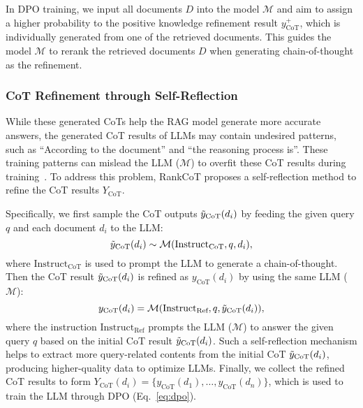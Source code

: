 In DPO training, we input all documents $D$ into the model $\mathcal{M}$ and aim to assign a higher probability to the positive knowledge refinement result $y_\text{CoT}^+$, which is individually generated from one of the retrieved documents. This guides the model $\mathcal{M}$ to rerank the retrieved documents $D$ when generating chain-of-thought as the refinement.



\subsubsection{CoT Refinement through Self-Reflection}
While these generated CoTs help the RAG model generate more accurate answers, the generated CoT results of LLMs may contain undesired patterns, such as ``According to the document'' and ``the reasoning process is''. These training patterns can mislead the LLM ($\mathcal{M}$) to overfit these CoT results during training~\cite{gudibande2023false}. To address this problem, RankCoT proposes a self-reflection method to refine the CoT results $Y_\text{CoT}$.

Specifically, we first sample the CoT outputs $\Tilde{y}_\text{CoT} (d_i)$ by feeding the given query $q$ and each document $d_i$ to the LLM: 
\begin{equation}
 \Tilde{y}_\text{CoT} (d_i) \sim \mathcal{M} (\text{Instruct}_\text{CoT}, q, d_i),
\end{equation}
where $\text{Instruct}_\text{CoT}$ is used to prompt the LLM to generate a chain-of-thought. Then the CoT result $\Tilde{y}_\text{CoT} (d_i)$ is refined as $y_\text{CoT} (d_i)$ by using the same LLM ($\mathcal{M}$):
\begin{equation}
 y_\text{CoT} (d_i) = \mathcal{M} (\text{Instruct}_\text{Ref}, q, \Tilde{y}_\text{CoT} (d_i)),
\end{equation}
where the instruction $\text{Instruct}_\text{Ref}$ prompts the LLM ($\mathcal{M}$) to answer the given query $q$ based on the initial CoT result $\Tilde{y}_\text{CoT} (d_i)$. Such a self-reflection mechanism helps to extract more query-related contents from the initial CoT $\Tilde{y}_\text{CoT} (d_i)$, producing higher-quality data to optimize LLMs.
Finally, we collect the refined CoT results to form $Y_\text{CoT} (d_i) = \{y_\text{CoT} (d_1), \dots, y_\text{CoT} (d_n)\}$, which is used to train the LLM through DPO (Eq.~\ref{eq:dpo}).





